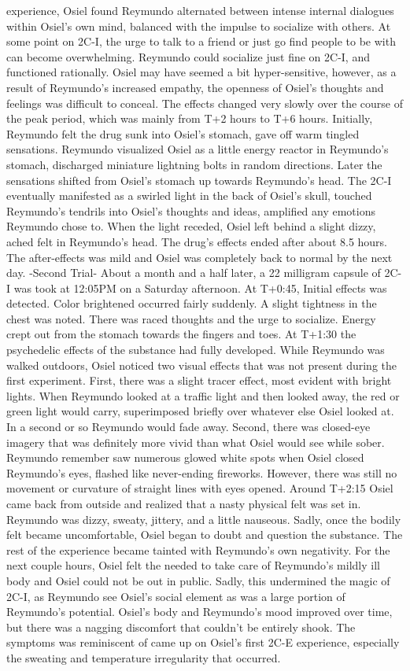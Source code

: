 \documentclass[12pt]{book}
\begin{document}
experience, Osiel found Reymundo alternated between intense internal dialogues within Osiel's own mind, balanced with the impulse to socialize with others. At some point on 2C-I, the urge to talk to a friend or just go find people to be with can become overwhelming. Reymundo could socialize just fine on 2C-I, and functioned rationally. Osiel may have seemed a bit hyper-sensitive, however, as a result of Reymundo's increased empathy, the openness of Osiel's thoughts and feelings was difficult to conceal. The effects changed very slowly over the course of the peak period, which was mainly from T+2 hours to T+6 hours. Initially, Reymundo felt the drug sunk into Osiel's stomach, gave off warm tingled sensations. Reymundo visualized Osiel as a little energy reactor in Reymundo's stomach, discharged miniature lightning bolts in random directions. Later the sensations shifted from Osiel's stomach up towards Reymundo's head. The 2C-I eventually manifested as a swirled light in the back of Osiel's skull, touched Reymundo's tendrils into Osiel's thoughts and ideas, amplified any emotions Reymundo chose to. When the light receded, Osiel left behind a slight dizzy, ached felt in Reymundo's head. The drug's effects ended after about 8.5 hours. The after-effects was mild and Osiel was completely back to normal by the next day. -Second Trial- About a month and a half later, a 22 milligram capsule of 2C-I was took at 12:05PM on a Saturday afternoon. At T+0:45, Initial effects was detected. Color brightened occurred fairly suddenly. A slight tightness in the chest was noted. There was raced thoughts and the urge to socialize. Energy crept out from the stomach towards the fingers and toes. At T+1:30 the psychedelic effects of the substance had fully developed. While Reymundo was walked outdoors, Osiel noticed two visual effects that was not present during the first experiment. First, there was a slight tracer effect, most evident with bright lights. When Reymundo looked at a traffic light and then looked away, the red or green light would carry, superimposed briefly over whatever else Osiel looked at. In a second or so Reymundo would fade away. Second, there was closed-eye imagery that was definitely more vivid than what Osiel would see while sober. Reymundo remember saw numerous glowed white spots when Osiel closed Reymundo's eyes, flashed like never-ending fireworks. However, there was still no movement or curvature of straight lines with eyes opened. Around T+2:15 Osiel came back from outside and realized that a nasty physical felt was set in. Reymundo was dizzy, sweaty, jittery, and a little nauseous. Sadly, once the bodily felt became uncomfortable, Osiel began to doubt and question the substance. The rest of the experience became tainted with Reymundo's own negativity. For the next couple hours, Osiel felt the needed to take care of Reymundo's mildly ill body and Osiel could not be out in public. Sadly, this undermined the magic of 2C-I, as Reymundo see Osiel's social element as was a large portion of Reymundo's potential. Osiel's body and Reymundo's mood improved over time, but there was a nagging discomfort that couldn't be entirely shook. The symptoms was reminiscent of came up on Osiel's first 2C-E experience, especially the sweating and temperature irregularity that occurred. 
\end{document}
